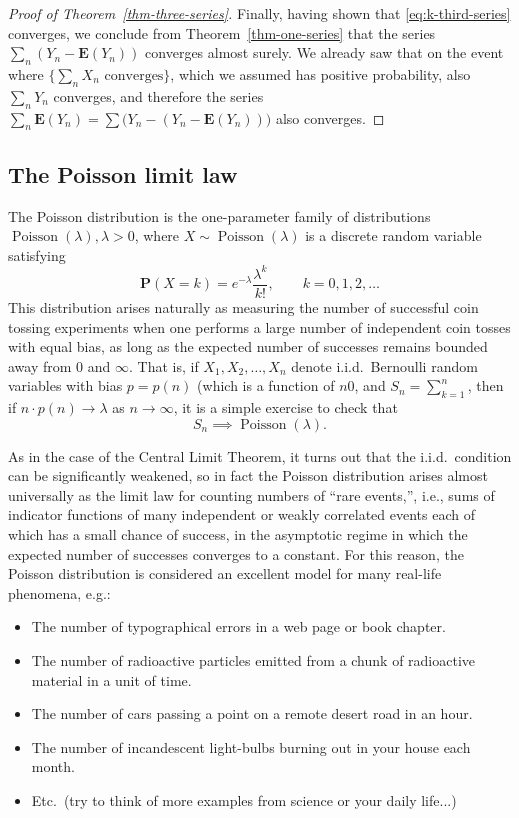 \documentclass[12pt]{article}
\newcommand{\prob}{\mathbf{P}}
\newcommand{\expec}{\mathbf{E}}
\theoremstyle{example}
\begin{document}
\begin{proof}[Proof of Theorem~\ref{thm-three-series}]
Finally, having shown that \eqref{eq:k-third-series} converges, we conclude from Theorem~\ref{thm-one-series} that the series $\sum_n \left(Y_n-\expec(Y_n)\right)$ converges almost surely. We already saw that on the event where $\{ \sum_n X_n \textrm{ converges}\}$, which we assumed has positive probability, also $\sum_n Y_n$ converges, and therefore the series $\sum_n \expec(Y_n) = \sum \big(Y_n - (Y_n-\expec(Y_n))\big)$ also converges.

\end{proof}


\subsection{The Poisson limit law}

\label{sec:poisson-limit}

The Poisson distribution is the one-parameter family of distributions $\operatorname{Poisson}(\lambda), \lambda>0$, where $X\sim \operatorname{Poisson}(\lambda)$ is a discrete random variable satisfying
$$ \prob(X=k) = e^{-\lambda} \frac{\lambda^k}{k!}, \qquad k=0,1,2,\ldots $$
This distribution arises naturally as measuring the number of successful coin tossing experiments when one performs a large number of independent coin tosses with equal bias, as long as the expected number of successes remains bounded away from $0$ and $\infty$. That is, if $X_1,X_2,\ldots,X_n$ denote i.i.d.\ Bernoulli random variables with bias $p=p(n)$ (which is a function of $n$0, and $S_n=\sum_{k=1}^n$, then if $n\cdot p(n) \to \lambda$ as $n\to\infty$, it is a simple exercise to check that
\begin{equation}\label{eq:law-small-numbers-iid}
S_n \implies \operatorname{Poisson}(\lambda).
\end{equation}

As in the case of the Central Limit Theorem, it turns out that the i.i.d.\ condition can be significantly weakened, so in fact the Poisson distribution arises almost universally as the limit law for counting numbers of ``rare events,'', i.e., sums of indicator functions of many independent or weakly correlated events each of which has a small chance of success, in the asymptotic regime in which the expected number of successes converges to a constant. For this reason, the Poisson distribution is considered an excellent model for many real-life phenomena, e.g.:
\begin{itemize}
\item The number of typographical errors in a web page or book chapter.
\item The number of radioactive particles emitted from a chunk of radioactive material in a unit of time.
\item The number of cars passing a point on a remote desert road in an hour.
\item The number of incandescent light-bulbs burning out in your house each month.
\item Etc.\ (try to think of more examples from science or your daily life...)
\end{itemize}
\end{document}
